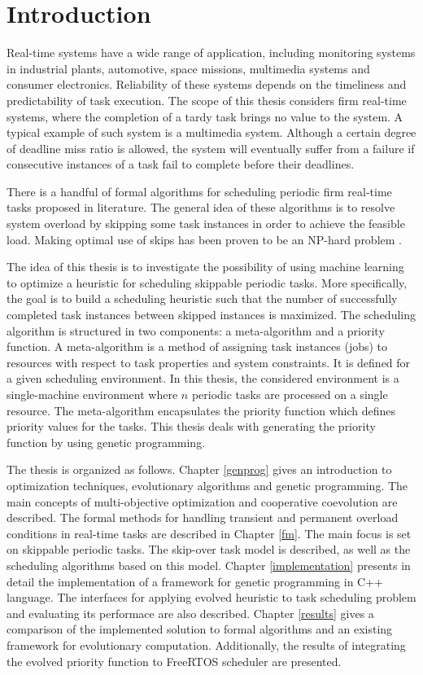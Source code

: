 \chapter{Introduction}
Real-time systems have a wide range of application, including monitoring systems in industrial plants, automotive, space missions, multimedia systems and consumer electronics.
Reliability of these systems depends on the timeliness and predictability of task execution.
The scope of this thesis considers firm real-time systems, where the completion of a tardy task brings no value to the system.
A typical example of such system is a multimedia system.
Although a certain degree of deadline miss ratio is allowed, the system will eventually suffer from a failure if consecutive instances of a task fail to complete before their deadlines.

There is a handful of formal algorithms for scheduling periodic firm real-time tasks proposed in literature.
The general idea of these algorithms is to resolve system overload by skipping some task instances in order to achieve the feasible load.
Making optimal use of skips has been proven to be an NP-hard problem \cite{queudet2012quality}.

The idea of this thesis is to investigate the possibility of using machine learning to optimize a heuristic for scheduling skippable periodic tasks.
More specifically, the goal is to build a scheduling heuristic such that the number of successfully completed task instances between skipped instances is maximized.
The scheduling algorithm is structured in two components: a meta-algorithm and a priority function.
A meta-algorithm is a method of assigning task instances (jobs) to resources with respect to task properties and system constraints.
It is defined for a given scheduling environment.
In this thesis, the considered environment is a single-machine environment where $n$ periodic tasks are processed on a single resource. 
The meta-algorithm encapsulates the priority function which defines priority values for the tasks.
This thesis deals with generating the priority function by using genetic programming.

The thesis is organized as follows.
Chapter \ref{genprog} gives an introduction to optimization techniques, evolutionary algorithms and genetic programming.
The main concepts of multi-objective optimization and cooperative coevolution are described.
The formal methods for handling transient and permanent overload conditions in real-time tasks are described in Chapter \ref{fm}.
The main focus is set on skippable periodic tasks.
The skip-over task model is described, as well as the scheduling algorithms based on this model.
Chapter \ref{implementation} presents in detail the implementation of a framework for genetic programming in C++ language.
The interfaces for applying evolved heuristic to task scheduling problem and evaluating its performace are also described.
Chapter \ref{results} gives a comparison of the implemented solution to formal algorithms and an existing framework for evolutionary computation.
Additionally, the results of integrating the evolved priority function to FreeRTOS scheduler are presented.